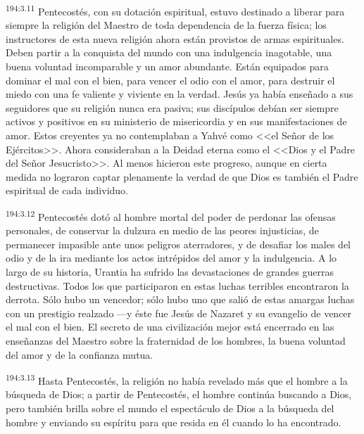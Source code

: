 \par 
\textsuperscript{194:3.11} Pentecostés, con su dotación espiritual, estuvo destinado a liberar para siempre la religión del Maestro de toda dependencia de la fuerza física; los instructores de esta nueva religión ahora están provistos de armas espirituales. Deben partir a la conquista del mundo con una indulgencia inagotable, una buena voluntad incomparable y un amor abundante. Están equipados para dominar el mal con el bien, para vencer el odio con el amor, para destruir el miedo con una fe valiente y viviente en la verdad. Jesús ya había enseñado a sus seguidores que su religión nunca era pasiva; sus discípulos debían ser siempre activos y positivos en su ministerio de misericordia y en sus manifestaciones de amor. Estos creyentes ya no contemplaban a Yahvé como <<el Señor de los Ejércitos>>. Ahora consideraban a la Deidad eterna como el <<Dios y el Padre del Señor Jesucristo>>. Al menos hicieron este progreso, aunque en cierta medida no lograron captar plenamente la verdad de que Dios es también el Padre espiritual de cada individuo.

\par 
\textsuperscript{194:3.12} Pentecostés dotó al hombre mortal del poder de perdonar las ofensas personales, de conservar la dulzura en medio de las peores injusticias, de permanecer impasible ante unos peligros aterradores, y de desafiar los males del odio y de la ira mediante los actos intrépidos del amor y la indulgencia. A lo largo de su historia, Urantia ha sufrido las devastaciones de grandes guerras destructivas. Todos los que participaron en estas luchas terribles encontraron la derrota. Sólo hubo un vencedor; sólo hubo uno que salió de estas amargas luchas con un prestigio realzado ---y éste fue Jesús de Nazaret y su evangelio de vencer el mal con el bien. El secreto de una civilización mejor está encerrado en las enseñanzas del Maestro sobre la fraternidad de los hombres, la buena voluntad del amor y de la confianza mutua.

\par 
\textsuperscript{194:3.13} Hasta Pentecostés, la religión no había revelado más que el hombre a la búsqueda de Dios; a partir de Pentecostés, el hombre continúa buscando a Dios, pero también brilla sobre el mundo el espectáculo de Dios a la búsqueda del hombre y enviando su espíritu para que resida en él cuando lo ha encontrado.

